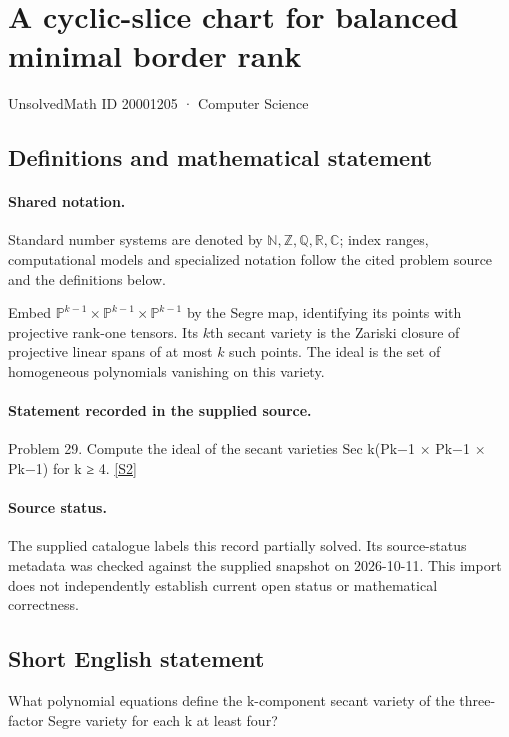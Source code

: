 \documentclass[11pt]{article}
\newcommand{\sref}[2]{\hyperlink{source:#1:#2}{[S#2]}}
\begin{document}
\setcounter{section}{20001204}
\section{A cyclic-slice chart for balanced minimal border rank}\label{20001205}
{\small\sffamily UnsolvedMath ID 20001205 · Computer Science}
\subsection{Definitions and mathematical statement}

\paragraph{Shared notation.}Standard number systems are denoted by $\mathbb N,\mathbb Z,\mathbb Q,\mathbb R,\mathbb C$; index ranges, computational models and specialized notation follow the cited problem source and the definitions below.


Embed $\mathbb P^{k-1}\times\mathbb P^{k-1}\times\mathbb P^{k-1}$ by the Segre map, identifying its points with projective rank-one tensors. Its $k$th secant variety is the Zariski closure of projective linear spans of at most $k$ such points. The ideal is the set of homogeneous polynomials vanishing on this variety.
\paragraph{Statement recorded in the supplied source.}
Problem 29. Compute the ideal of the secant varieties Sec k(Pk−1 × Pk−1 × Pk−1) for k ≥ 4. \sref{20001205}{2}
\paragraph{Source status.}
The supplied catalogue labels this record partially solved. Its source-status metadata was checked against the supplied snapshot on 2026-10-11. This import does not independently establish current open status or mathematical correctness.
\subsection{Short English statement}
What polynomial equations define the k-component secant variety of the three-factor Segre variety for each k at least four?
\end{document}
